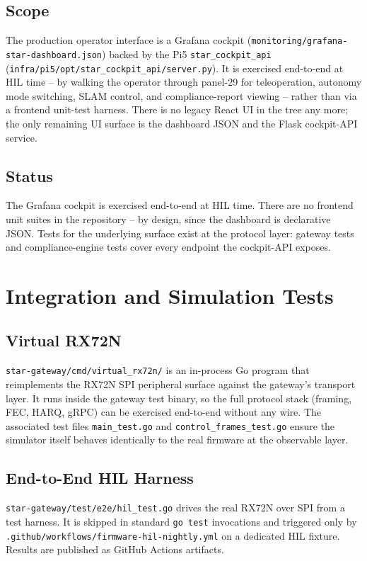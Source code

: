 \documentclass[11pt,letterpaper]{article}
\begin{document}
\subsection{Scope}
The production operator interface is a Grafana cockpit
(\texttt{monitoring/grafana-star-dashboard.json}) backed by the Pi5
\texttt{star\_cockpit\_api}
(\texttt{infra/pi5/opt/star\_cockpit\_api/server.py}). It is
exercised end-to-end at HIL time -- by walking the operator through
panel-29 for teleoperation, autonomy mode switching, SLAM control,
and compliance-report viewing -- rather than via a frontend unit-test
harness. There is no legacy React UI in the tree any more; the only
remaining UI surface is the dashboard JSON and the Flask cockpit-API
service.

\subsection{Status}
The Grafana cockpit is exercised end-to-end at HIL time. There are
no frontend unit suites in the repository -- by design, since the
dashboard is declarative JSON. Tests for the underlying surface
exist at the protocol layer: gateway tests and compliance-engine
tests cover every endpoint the cockpit-API exposes.

\section{Integration and Simulation Tests}
\label{sec:int}

\subsection{Virtual RX72N}
\texttt{star-gateway/cmd/virtual\_rx72n/} is an in-process Go program
that reimplements the RX72N SPI peripheral surface against the
gateway's transport layer. It runs inside the gateway test binary,
so the full protocol stack (framing, FEC, HARQ, gRPC) can be
exercised end-to-end without any wire. The associated test files
\texttt{main\_test.go} and \texttt{control\_frames\_test.go} ensure
the simulator itself behaves identically to the real firmware at
the observable layer.

\subsection{End-to-End HIL Harness}
\texttt{star-gateway/test/e2e/hil\_test.go} drives the real RX72N
over SPI from a test harness. It is skipped in standard \texttt{go
test} invocations and triggered only by
\texttt{.github/workflows/firmware-hil-nightly.yml} on a dedicated
HIL fixture. Results are published as GitHub Actions artifacts.
\end{document}
